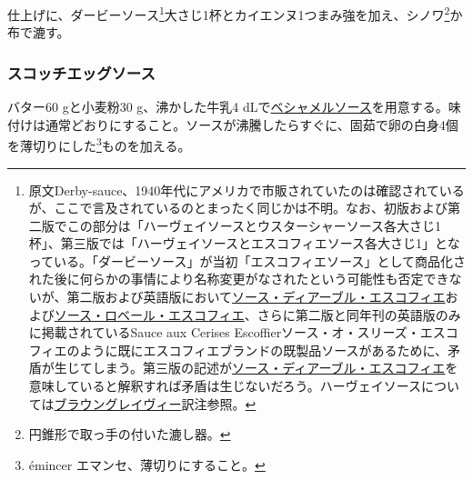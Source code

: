 \begin{recette}
仕上げに、ダービーソース\footnote{原文Derby-sauce、1940年代にアメリカで市販されていたのは確認されているが、ここで言及されているのとまったく同じかは不明。なお、初版および第二版でこの部分は「ハーヴェイソースとウスターシャーソース各大さじ1杯」、第三版では「ハーヴェイソースとエスコフィエソース各大さじ1」となっている。「ダービーソース」が当初「エスコフィエソース」として商品化された後に何らかの事情により名称変更がなされたという可能性も否定できないが、第二版および英語版において\protect\hyperlink{sauce-diable-escoffier}{ソース・ディアーブル・エスコフィエ}および\protect\hyperlink{sauce-robert-escoffier}{ソース・ロベール・エスコフィエ}、さらに第二版と同年刊の英語版のみに掲載されているSauce
  aux Cerises
  Escoffierソース・オ・スリーズ・エスコフィエのように既にエスコフィエブランドの既製品ソースがあるために、矛盾が生じてしまう。第三版の記述が\protect\hyperlink{sauce-diable-escoffier}{ソース・ディアーブル・エスコフィエ}を意味していると解釈すれば矛盾は生じないだろう。ハーヴェイソースについては\protect\hyperlink{brown-gravy}{ブラウングレイヴィー}訳注参照。}大さじ1杯とカイエンヌ1つまみ強を加え、シノワ\footnote{円錐形で取っ手の付いた漉し器。}か布で漉す。

\atoaki{}

\hypertarget{scotch-eggs-sauce}{%
\subsubsection{スコッチエッグソース}\label{scotch-eggs-sauce}}



バター60 gと小麦粉30 g、沸かした牛乳4
dLで\protect\hyperlink{sauce-bechamel}{ベシャメルソース}を用意する。味付けは通常どおりにすること。ソースが沸騰したらすぐに、固茹で卵の白身4個を薄切りにした\footnote{émincer
  エマンセ、薄切りにすること。}ものを加える。


\end{recette}
